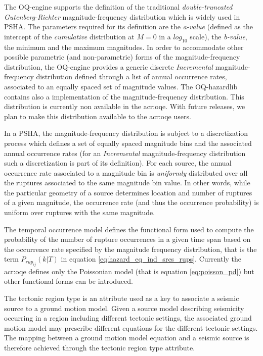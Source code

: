 The OQ-engine supports the definition of the traditional
\textit{double-truncated Gutenberg-Richter} magnitude-frequency distribution
which is widely used in PSHA. 
%
The parameters required for its definition are the \textit{a-value}
(defined as the intercept of the \textit{cumulative} distribution at $M=0$ in a
$log_{10}$ scale), the \textit{b-value}, the minimum and the maximum magnitudes.
%
In order to accommodate other possible parametric (and non-parametric) forms of
the magnitude-frequency distribution, the OQ-engine provides a generic discrete
\textit{Incremental} magnitude-frequency distribution defined through a list of
annual occurrence rates, associated to an equally spaced set of magnitude
values.
%
The OQ-hazardlib contains also a implementation of the \textcite{youngs1985}
magnitude-frequency distribution. This distribution is currently non available 
in the \gls{acr:oqe}. With future releases, we plan to make this distribution
available to the \gls{acr:oqe} users.

In a PSHA, the magnitude-frequency distribution is subject to a discretization
process which defines a set of equally spaced magnitude bins and the associated
annual occurrence rates (for an \textit{Incremental} magnitude-frequency
distribution such a discretization is part of its definition). For each source,
the annual occurrence rate associated to a magnitude bin is \textit{uniformly}
distributed over all the ruptures associated to the same magnitude bin value. In
other words, while the particular geometry of a source determines location and
number of ruptures of a given magnitude, the occurrence rate (and thus the
occurrence probability) is uniform over ruptures with the same magnitude.

The temporal occurrence model defines the functional form used to compute the probability of
the number of rupture occurrences in a given time span based on the occurrence rate specified
by the magnitude frequency distribution, that is the term $P_{rup_{ij}}(k | T)$ in equation
\ref{eq:hazard_eq_ind_srcs_rups}. Currently the \gls{acr:oqe} defines only the Poissonian model
(that is equation \ref{eq:poisson_pd}) but other functional forms can be introduced.

The tectonic region type is an attribute used as a key to associate a seismic source to a ground
motion model. Given a source model describing seismicity occurring in a region
including different tectonic settings, the associated ground motion model may
prescribe different equations for the different tectonic settings. The mapping
between a ground motion model equation and a seismic source is therefore
achieved through the tectonic region type attribute.

